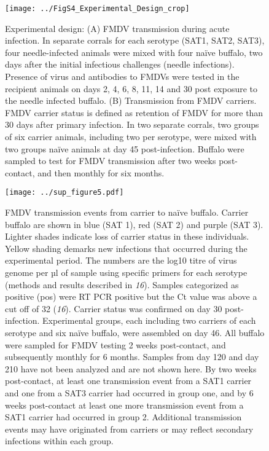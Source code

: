 \documentclass[12pt, USenglish]{article}  %
\begin{document}
\begin{figure}
  \centering
  \texttt{[image: ../FigS4\_Experimental\_Design\_crop]}
  \caption{Experimental design: (A) FMDV transmission during acute infection. In separate corrals for each serotype (SAT1, SAT2, SAT3), four needle-infected animals were mixed with four naïve buffalo, two days after the initial infectious challenges (needle infections). Presence of virus and antibodies to FMDVs were tested in the recipient animals on days 2, 4, 6, 8, 11, 14 and 30 post exposure to the needle infected buffalo. (B) Transmission from FMDV carriers. FMDV carrier status is defined as retention of FMDV for more than 30 days after primary infection. In two separate corrals, two groups of six carrier animals, including two per serotype, were mixed with two groups naïve animals at day 45 post-infection. Buffalo were sampled to test for FMDV transmission after two weeks post-contact, and then monthly for six months.}
\end{figure}

\begin{figure}
  \centering
  \texttt{[image: ../sup\_figure5.pdf]}
  \caption{FMDV transmission events from carrier to naïve
    buffalo. Carrier buffalo are shown in blue (SAT 1), red (SAT 2) and purple (SAT 3). Lighter shades indicate loss of carrier status in these individuals. Yellow shading demarks new infections that occurred during the experimental period. The numbers are the log10 titre of virus genome per \unit{µl} of sample using specific
    primers for each serotype (methods and results described in
    \textit{16}). Samples categorized as positive (pos) were RT PCR
    positive but the Ct value was above a cut off of 32
    (\textit{16}). Carrier status was confirmed on day 30
    post-infection. Experimental groups, each including two carriers
    of each serotype and six naïve buffalo, were assembled on day
    46. All buffalo were sampled for FMDV testing 2 weeks
    post-contact, and subsequently monthly for 6 months. Samples from
    day 120 and day 210 have not been analyzed and are not shown
    here. By two weeks post-contact, at least one transmission event
    from a SAT1 carrier and one from a SAT3 carrier had occurred in
    group one, and by 6 weeks post-contact at least one more
    transmission event from a SAT1 carrier had occurred in group
    2. Additional transmission events may have originated from
    carriers or may reflect secondary infections within each group.}
\end{figure}
\end{document}
